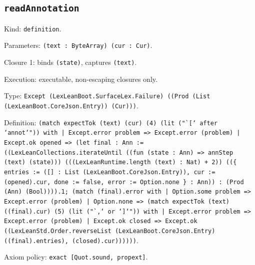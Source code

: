 \documentclass[11pt]{article}
\begin{document}
\subsection*{\texttt{readAnnotation}}
\noindent Kind: \texttt{definition}.\par
\noindent Parameters: \texttt{(text : ByteArray) (cur : Cur)}.\par
\noindent Closure 1: binds \texttt{(state)}, captures \texttt{(text)}.\par
\noindent Execution: executable, non-escaping closures only.\par
\noindent Type: \texttt{Except (LexLeanBoot.SurfaceLex.Failure) ((Prod (List (LexLeanBoot.CoreJson.Entry)) (Cur)))}.\par
\noindent Definition: \texttt{(match expectTok (text) (cur) (4) (lit ("`[` after `annot`")) with | Except.error problem => Except.error (problem) | Except.ok opened => (let final : Ann := ((LexLeanCollections.iterateUntil ((fun (state : Ann) => annStep (text) (state))) (((LexLeanRuntime.length (text) : Nat) + 2)) ((\{ entries := ([] : List (LexLeanBoot.CoreJson.Entry)), cur := (opened).cur, done := false, error := Option.none \} : Ann)) : (Prod (Ann) (Bool)))).1; (match (final).error with | Option.some problem => Except.error (problem) | Option.none => (match expectTok (text) ((final).cur) (5) (lit ("`,` or `]`")) with | Except.error problem => Except.error (problem) | Except.ok closed => Except.ok ((LexLeanStd.Order.reverseList (LexLeanBoot.CoreJson.Entry) ((final).entries), (closed).cur))))))}.\par
\noindent Axiom policy: \texttt{exact [Quot.sound, propext]}.\par
\end{document}
